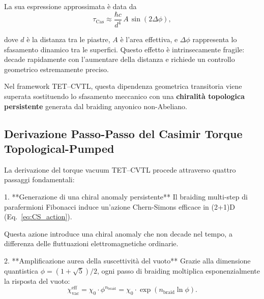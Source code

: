 \documentclass[11pt,a4paper]{article}
\theoremstyle{plain}
\theoremstyle{definition}
\begin{document}
\vspace{0.3cm}


La sua espressione approssimata è data da
\begin{equation}
\tau_{\text{Cas}} \approx \frac{\hbar c}{d^4} \, A \, \sin(2\Delta\phi),
\label{eq:casimir_torque_classic}
\end{equation}

\vspace{0.3cm}


dove $d$ è la distanza tra le piastre, $A$ è l'area effettiva, e $\Delta\phi$ rappresenta lo sfasamento dinamico tra le superfici. Questo effetto è intrinsecamente fragile: decade rapidamente con l'aumentare della distanza e richiede un controllo geometrico estremamente preciso.



\vspace{0.4cm}

Nel framework TET--CVTL, questa dipendenza geometrica transitoria viene superata sostituendo lo sfasamento meccanico con una \textbf{chiralità topologica persistente} generata dal braiding anyonico non-Abeliano.










\subsection{Derivazione Passo-Passo del Casimir Torque Topological-Pumped}


\vspace{0.2cm}

La derivazione del torque vacuum TET--CVTL procede attraverso quattro passaggi fondamentali:

\vspace{0.3cm}

1. **Generazione di una chiral anomaly persistente**  
   Il braiding multi-step di parafermioni Fibonacci induce un'azione Chern-Simons efficace in (2+1)D (Eq.~\eqref{eq:CS_action}). 
   
   
   \vspace{0.2cm}
   Questa azione introduce una chiral anomaly che non decade nel tempo, a differenza delle fluttuazioni elettromagnetiche ordinarie.

   \vspace{0.3cm}

2. **Amplificazione aurea della suscettività del vuoto**  
   Grazie alla dimensione quantistica $\phi = (1+\sqrt{5})/2$, ogni passo di braiding moltiplica esponenzialmente la risposta del vuoto:
   \begin{equation}
   \chi_{\text{vac}}^{\text{eff}} = \chi_0 \cdot \phi^{n_{\text{braid}}} = \chi_0 \cdot \exp(n_{\text{braid}} \ln\phi).
   \label{eq:vacuum_susceptibility}
   \end{equation}
\end{document}
